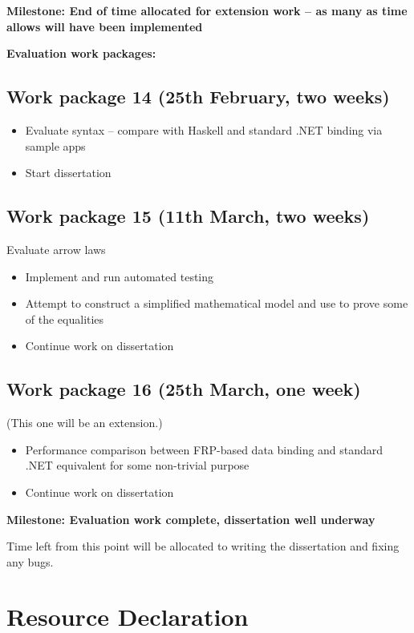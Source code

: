 \documentclass[12pt,a4]{article}
\begin{document}
	\noindent \textbf{Milestone: End of time allocated for extension work -- as many as time allows will have been implemented}
	
	\noindent \textbf{Evaluation work packages:}
	
	\subsection{Work package 14 (25th February, two weeks)}
		\begin{itemize}
			\item Evaluate syntax -- compare with Haskell and standard .NET binding via sample apps
			\item Start dissertation
		\end{itemize}
	
		
	\subsection{Work package 15 (11th March, two weeks)}
		Evaluate arrow laws
		\begin{itemize}
			\item Implement and run automated testing
			\item Attempt to construct a simplified mathematical model and use to prove some of the equalities
			\item Continue work on dissertation
		\end{itemize}

	
	\subsection{Work package 16 (25th March, one week)}
		(This one will be an extension.)
		\begin{itemize}
			\item Performance comparison between FRP-based data binding and standard .NET equivalent for some non-trivial purpose
			\item Continue work on dissertation
		\end{itemize}
	
	\noindent \textbf{Milestone: Evaluation work complete, dissertation well underway}
	
	\noindent Time left from this point will be allocated to writing the dissertation and fixing any bugs.

\section{Resource Declaration}
\end{document}
